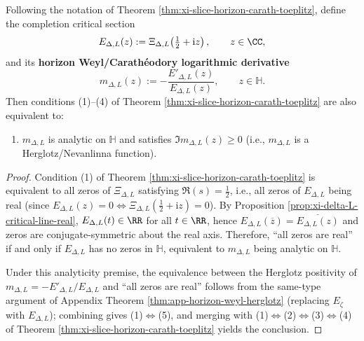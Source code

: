 \begin{corollary}\label{cor:xi-slice-weyl-herglotz}
Following the notation of Theorem \ref{thm:xi-slice-horizon-carath-toeplitz}, define the completion critical section
\[
E_{\Delta,L}(z):=\Xi_{\Delta,L}\!\left(\tfrac12+\mathrm{i}z\right),
\qquad z\in\CC,
\]
and its \textbf{horizon Weyl/Carath\'eodory logarithmic derivative}
\[
m_{\Delta,L}(z):=-\frac{E'_{\Delta,L}(z)}{E_{\Delta,L}(z)},
\qquad z\in\mathbb{H}.
\]
Then conditions (1)--(4) of Theorem \ref{thm:xi-slice-horizon-carath-toeplitz} are also equivalent to:
\begin{enumerate}
  \item[(5)] \(m_{\Delta,L}\) is analytic on \(\mathbb{H}\) and satisfies \(\Im m_{\Delta,L}(z)\ge 0\) (i.e., \(m_{\Delta,L}\) is a Herglotz/Nevanlinna function).
\end{enumerate}
\end{corollary}
\begin{proof}
Condition (1) of Theorem \ref{thm:xi-slice-horizon-carath-toeplitz} is equivalent to all zeros of \(\Xi_{\Delta,L}\) satisfying \(\Re(s)=\tfrac12\), i.e., all zeros of \(E_{\Delta,L}\) being real (since \(E_{\Delta,L}(z)=0\iff \Xi_{\Delta,L}(\tfrac12+\mathrm{i}z)=0\)).
By Proposition \ref{prop:xi-delta-L-critical-line-real}, \(E_{\Delta,L}(t)\in\RR\) for all \(t\in\RR\), hence \(E_{\Delta,L}(\overline z)=\overline{E_{\Delta,L}(z)}\) and zeros are conjugate-symmetric about the real axis.
Therefore, ``all zeros are real'' if and only if \(E_{\Delta,L}\) has no zeros in \(\mathbb{H}\), equivalent to \(m_{\Delta,L}\) being analytic on \(\mathbb{H}\).
\par
Under this analyticity premise, the equivalence between the Herglotz positivity of \(m_{\Delta,L}=-E'_{\Delta,L}/E_{\Delta,L}\) and ``all zeros are real'' follows from the same-type argument of Appendix Theorem \ref{thm:app-horizon-weyl-herglotz} (replacing \(E_{\zeta}\) with \(E_{\Delta,L}\));
combining gives (1)\(\Longleftrightarrow\)(5), and merging with (1)\(\Longleftrightarrow\)(2)\(\Longleftrightarrow\)(3)\(\Longleftrightarrow\)(4) of Theorem \ref{thm:xi-slice-horizon-carath-toeplitz} yields the conclusion. \qedhere
\end{proof}

